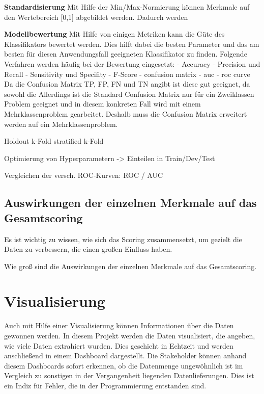 


\textbf{Standardisierung}
Mit Hilfe der Min/Max-Normierung können Merkmale auf den Wertebereich [0,1] abgebildet werden. 
Dadurch werden 





\textbf{Modellbewertung}
Mit Hilfe von einigen Metriken kann die Güte des Klassifikators bewertet werden.
Dies hilft dabei die besten Parameter und das am besten für diesen Anwendungsfall geeigneten Klassifikator zu finden.
Folgende Verfahren werden häufig bei der Bewertung eingesetzt:
- Accuracy
- Precision und Recall
- Sensitivity und Specifity
- F-Score
- confusion matrix
- auc - roc curve \\
Da die Confusion Matrix TP, FP, FN und TN angibt ist diese gut geeignet, da sowohl die 
Allerdings ist die Standard Confusion Matrix nur für ein Zweiklassen Problem geeignet und in diesem konkreten Fall wird mit einem Mehrklassenproblem gearbeitet.
Deshalb muss die Confusion Matrix erweitert werden auf ein Mehrklassenproblem.


Holdout
k-Fold
stratified k-Fold

Optimierung von Hyperparametern 
-> Einteilen in Train/Dev/Test

Vergleichen der versch. ROC-Kurven:
ROC / AUC

\subsection{Auswirkungen der einzelnen Merkmale auf das Gesamtscoring}
Es ist wichtig zu wissen, wie sich das Scoring zusammensetzt, um gezielt die Daten zu verbessern, die einen großen Einfluss haben. 

Wie groß sind die Auswirkungen der einzelnen Merkmale auf das Gesamtscoring. 

\section{Visualisierung}
Auch mit Hilfe einer Visualisierung können Informationen über die Daten gewonnen werden.
In diesem Projekt werden die Daten visualisiert, die angeben, wie viele Daten extrahiert wurden.
Dies geschieht in Echtzeit und werden anschließend in einem Dashboard dargestellt.
Die Stakeholder können anhand diesem Dashboards sofort erkennen, ob die Datenmenge ungewöhnlich ist im Vergleich zu sonstigen in der Vergangenheit liegenden Datenlieferungen.
Dies ist ein Indiz für Fehler, die in der Programmierung entstanden sind.



